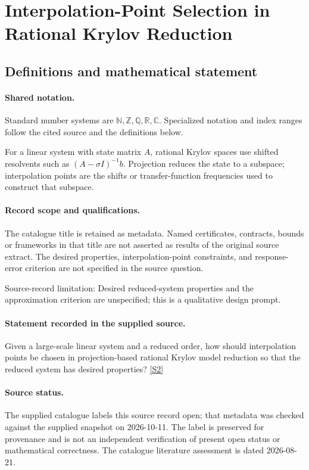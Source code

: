 \documentclass[11pt]{article}
\newcommand{\sref}[2]{\hyperlink{source:#1:#2}{[S#2]}}
\begin{document}
\section{Interpolation-Point Selection in Rational Krylov Reduction}\label{statement}

\subsection{Definitions and mathematical statement}

\paragraph{Shared notation.}Standard number systems are $\mathbb N,\mathbb Z,\mathbb Q,\mathbb R,\mathbb C$. Specialized notation and index ranges follow the cited source and the definitions below.


For a linear system with state matrix $A$, rational Krylov spaces use shifted resolvents such as $(A-\sigma I)^{-1}b$. Projection reduces the state to a subspace; interpolation points are the shifts or transfer-function frequencies used to construct that subspace.
\paragraph{Record scope and qualifications.}
The catalogue title is retained as metadata. Named certificates, contracts, bounds or frameworks in that title are not asserted as results of the original source extract.
The desired properties, interpolation-point constraints, and response-error criterion are not specified in the source question.

Source-record limitation: Desired reduced-system properties and the approximation criterion are unspecified; this is a qualitative design prompt.
\paragraph{Statement recorded in the supplied source.}
Given a large-scale linear system and a reduced order, how should interpolation points be chosen in projection-based rational Krylov model reduction so that the reduced system has desired properties? \sref{statement}{2}
\paragraph{Source status.}
The supplied catalogue labels this source record open; that metadata was checked against the supplied snapshot on 2026-10-11. The label is preserved for provenance and is not an independent verification of present open status or mathematical correctness. The catalogue literature assessment is dated 2026-08-21.
\end{document}

